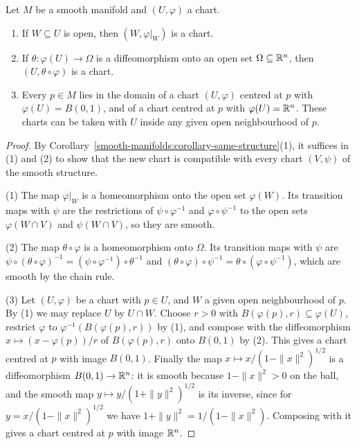 \begin{lemma}\label{smooth-manifolds:lemma-chart-operations}
Let $M$ be a smooth manifold and $(U, \varphi)$ a chart.
\begin{enumerate}
\item If $W \subseteq U$ is open, then $(W, \varphi|_W)$ is a chart.
\item If $\theta \colon \varphi(U) \to \Omega$ is a diffeomorphism onto an open set $\Omega \subseteq \mathbb{R}^n$, then $(U, \theta \circ \varphi)$ is a chart.
\item Every $p \in M$ lies in the domain of a chart $(U, \varphi)$ centred at $p$ with $\varphi(U) = B(0, 1)$, and of a chart centred at $p$ with
$\varphi(U) = \mathbb{R}^n$. These charts can be taken with $U$ inside any given open neighbourhood of $p$.
\end{enumerate}
\end{lemma}

\begin{proof}
By Corollary~\ref{smooth-manifolds:corollary-same-structure}(1), it suffices in (1) and (2) to show that the new chart is compatible with every chart $(V, \psi)$
of the smooth structure.

(1) The map $\varphi|_W$ is a homeomorphism onto the open set $\varphi(W)$. Its transition maps with $\psi$ are the restrictions of $\psi \circ \varphi^{-1}$ and
$\varphi \circ \psi^{-1}$ to the open sets $\varphi(W \cap V)$ and $\psi(W \cap V)$, so they are smooth.

(2) The map $\theta \circ \varphi$ is a homeomorphism onto $\Omega$. Its transition maps with $\psi$ are $\psi \circ (\theta \circ \varphi)^{-1} =
(\psi \circ \varphi^{-1}) \circ \theta^{-1}$ and $(\theta \circ \varphi) \circ \psi^{-1} = \theta \circ (\varphi \circ \psi^{-1})$, which are smooth by the chain
rule.

(3) Let $(U, \varphi)$ be a chart with $p \in U$, and $W$ a given open neighbourhood of $p$. By (1) we may replace $U$ by $U \cap W$. Choose $r > 0$ with
$B(\varphi(p), r) \subseteq \varphi(U)$, restrict $\varphi$ to $\varphi^{-1}(B(\varphi(p), r))$ by (1), and compose with the diffeomorphism
$x \mapsto (x - \varphi(p))/r$ of $B(\varphi(p), r)$ onto $B(0, 1)$ by (2). This gives a chart centred at $p$ with image $B(0, 1)$. Finally the map
$x \mapsto x/(1 - \|x\|^2)^{1/2}$ is a diffeomorphism $B(0, 1) \to \mathbb{R}^n$: it is smooth because $1 - \|x\|^2 > 0$ on the ball, and the smooth map
$y \mapsto y/(1 + \|y\|^2)^{1/2}$ is its inverse, since for $y = x/(1 - \|x\|^2)^{1/2}$ we have $1 + \|y\|^2 = 1/(1 - \|x\|^2)$. Composing with it gives a chart
centred at $p$ with image $\mathbb{R}^n$.
\end{proof}

